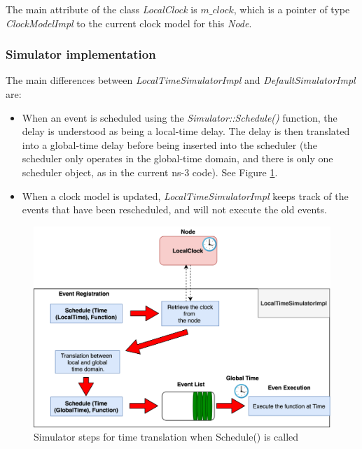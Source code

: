 \documentclass[times, twoside, watermark]{zHenriquesLab-StyleBioRxiv}
\begin{document}
The main attribute of the class \textit{LocalClock} is \(m\_clock\), which is a pointer of type \textit{ClockModelImpl} to the current clock model for this \textit{Node}. 

\subsubsection*{Simulator implementation}
The main differences between \textit{LocalTimeSimulatorImpl} and \textit{DefaultSimulatorImpl} are: 
\begin{itemize}
    \item  When an event is scheduled using the \textit{ Simulator::Schedule()} function, the delay is understood as being a local-time delay. The delay is then translated into a global-time delay before being inserted into the scheduler (the scheduler only operates in the global-time domain, and there is only one scheduler object, as in the current ns-3 code). See Figure \ref{fig:EventTimeTrans}.
    \item When a clock model is updated, \textit{LocalTimeSimulatorImpl} keeps track of the events that have been rescheduled, and will not execute the old events.
\end{itemize}

\begin{figure}%
\centering
\includegraphics[width=.8\linewidth]{Figures/EventQueueTrans1.png}
\caption{Simulator steps for time translation when Schedule() is called}
\label{fig:EventTimeTrans}
\end{figure}
\end{document}
